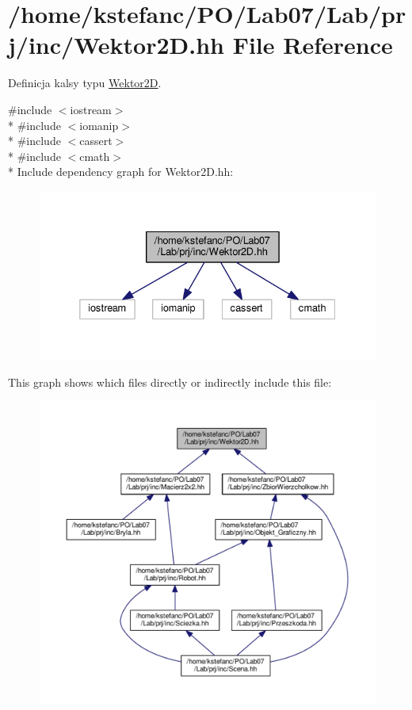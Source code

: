 \hypertarget{_wektor2_d_8hh}{\section{/home/kstefanc/\+P\+O/\+Lab07/\+Lab/prj/inc/\+Wektor2\+D.hh File Reference}
\label{_wektor2_d_8hh}
}


Definicja kalsy typu \hyperlink{class_wektor2_d}{Wektor2\+D}.  


{\ttfamily \#include $<$iostream$>$}\\*
{\ttfamily \#include $<$iomanip$>$}\\*
{\ttfamily \#include $<$cassert$>$}\\*
{\ttfamily \#include $<$cmath$>$}\\*
Include dependency graph for Wektor2\+D.\+hh\+:\nopagebreak
\begin{figure}[H]
\begin{center}
\leavevmode
\includegraphics[width=332pt]{_wektor2_d_8hh__incl}
\end{center}
\end{figure}
This graph shows which files directly or indirectly include this file\+:\nopagebreak
\begin{figure}[H]
\begin{center}
\leavevmode
\includegraphics[width=350pt]{_wektor2_d_8hh__dep__incl}
\end{center}
\end{figure}
